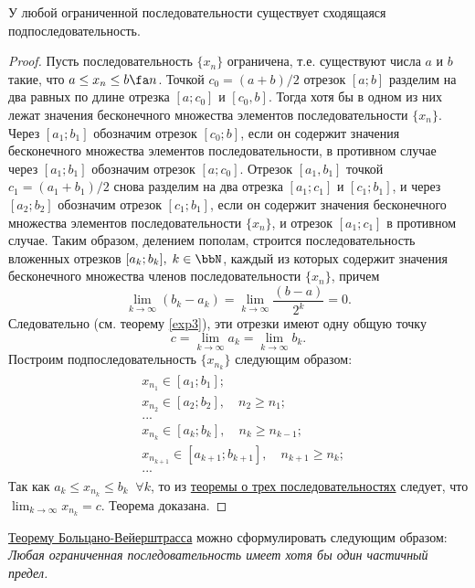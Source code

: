 \begin{thm}
\label{exp9}
У любой ограниченной последовательности существует сходящаяся подпоследовательность.
\end{thm}
\begin{proof}
Пусть последовательность $\{x_n\}$ ограничена, т.е. существуют числа $a$ и $b$ такие, что $a \le x_n \le b \fa n$. Точкой
$c_0 = (a + b)/2$ отрезок $[a; b]$ разделим на два равных по длине отрезка $[a; c_0]$ и $[c_0,b]$. Тогда хотя бы в одном из них лежат значения бесконечного множества элементов последовательности $\{x_n\}$. Через $[a_1;b_1]$ обозначим отрезок $[c_0;b]$, если он содержит значения бесконечного множества элементов последовательности, в противном случае через $[a_1; b_1]$ обозначим отрезок $[a; c_0]$. Отрезок $[a_1, b_1]$ точкой $c_1 = (a_1 + b_1)/2$ снова разделим на два отрезка $[a_1;c_1]$ и $[c_1;b_1]$, и через $[a_2;b_2]$ обозначим отрезок $[c_1;b_1]$, если он содержит значения бесконечного множества элементов последовательности $\{x_n\}$, и отрезок $[a_1; c_1]$ в противном случае. Таким образом, делением пополам, строится последовательность вложенных отрезков $[a_k;b_k],\; k \in \bbN$, каждый из которых содержит значения бесконечного множества членов последовательности $\{x_n\}$, причем
$$
\lim_{k\to \infty}(b_k-a_k)=\lim_{k \to \infty}\frac{(b-a)}{2^k}=0.
$$
Следовательно (см. теорему \ref{exp3}), эти отрезки имеют одну общую точку
$$
c = \lim_{k \to \infty} a_k = \lim_{k \to \infty} b_k.
$$
Построим подпоследовательность $\{x_{n_k}\}$ следующим образом:
\begin{gather*}
\begin{aligned}
& x_{n_1} \in [a_1;b_1];\\
& x_{n_2} \in [a_2;b_2],\quad n_2 \ge n_1;\\
& ...\\
& x_{n_k} \in [a_k;b_k],\quad n_k \ge n_{k-1};\\
& x_{n_{k+1}} \in [a_{k+1};b_{k+1}],\quad n_{k+1} \ge n_k;\\
& ...
\end{aligned}
\end{gather*}
Так как $a_k \le x_{n_k} \le b_k \;\; \forall k$, то из \hyperref[exp10]{теоремы о трех последовательностях} следует, что $\lim_{k \to \infty}\limits x_{n_k} = c$.
Теорема доказана.
\end{proof}

\hyperref[exp9]{Теорему Больцано-Вейерштрасса} можно сформулировать следующим образом: \textit{Любая ограниченная последовательность имеет хотя бы один частичный предел.}


